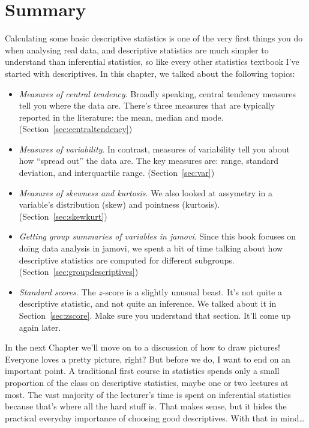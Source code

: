 \section{Summary}

Calculating some basic descriptive statistics is one of the very first things you do when analysing real data, and descriptive statistics are much simpler to understand than inferential statistics, so like every other statistics textbook I've started with descriptives. In this chapter, we talked about the following topics:

\begin{itemize}
\item {\it Measures of central tendency}. Broadly speaking, central tendency measures tell you where the data are. There's three measures that are typically reported in the literature: the mean, median and mode. (Section~\ref{sec:centraltendency})
\item {\it Measures of variability}. In contrast, measures of variability tell you about how ``spread out'' the data are. The key measures are: range, standard deviation, and interquartile range. (Section~\ref{sec:var})
\item {\it Measures of skewness and kurtosis}. We also looked at assymetry in a variable's distribution (skew) and pointness (kurtosis). (Section~\ref{sec:skewkurt})
\item {\it Getting group summaries of variables in jamovi}. Since this book focuses on doing data analysis in jamovi, we spent a bit of time talking about how descriptive statistics are computed for different subgroups. (Section~\ref{sec:groupdescriptives})
\item {\it Standard scores}. The $z$-score is a slightly unusual beast. It's not quite a descriptive statistic, and not quite an inference. We talked about it in Section~\ref{sec:zscore}. Make sure you understand that section. It'll come up again later. 
\end{itemize}
In the next Chapter we'll move on to a discussion of how to draw pictures! Everyone loves a pretty picture, right? But before we do, I want to end on an important point. A traditional first course in statistics spends only a small proportion of the class on descriptive statistics, maybe one or two lectures at most. The vast majority of the lecturer's time is spent on inferential statistics because that's where all the hard stuff is. That makes sense, but it hides the practical everyday importance of choosing good descriptives. With that in mind\ldots

